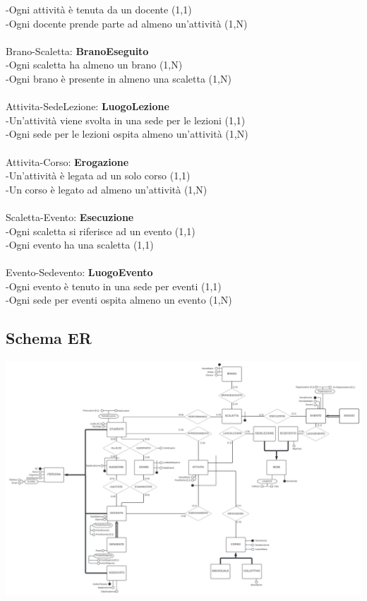 \documentclass[11pt]{article}
\begin{document}
		-Ogni attività è tenuta da un docente (1,1)\\
		-Ogni docente prende parte ad almeno un'attività (1,N)\\
		\\
		Brano-Scaletta: \textbf{BranoEseguito}\\
		-Ogni scaletta ha almeno un brano (1,N)\\
		-Ogni brano è presente in almeno una scaletta (1,N)\\
		\\
		Attivita-SedeLezione: \textbf{LuogoLezione}\\
		-Un'attività viene svolta in una sede per le lezioni (1,1)\\
		-Ogni sede per le lezioni ospita almeno un'attività (1,N)\\
		\\
		Attivita-Corso: \textbf{Erogazione}\\
		-Un'attività è legata ad un solo corso (1,1)\\
		-Un corso è legato ad almeno un'attività (1,N)\\
		\\
		Scaletta-Evento: \textbf{Esecuzione}\\
		-Ogni scaletta si riferisce ad un evento (1,1)\\
		-Ogni evento ha una scaletta (1,1)\\
		\\
		Evento-Sedevento: \textbf{LuogoEvento}\\
		-Ogni evento è tenuto in una sede per eventi (1,1)\\
		-Ogni sede per eventi ospita almeno un evento (1,N)\\
	\subsection{Schema ER}
		\includegraphics[scale=0.6]{../SchemaConcettuale/ER-LUCIDCHART - ER-concettuale 1.jpeg}
\end{document}
